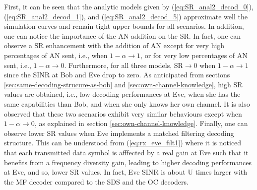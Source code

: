 \documentclass[journal,comsoc]{IEEEtran}
\begin{document}
First, it can be seen that the analytic models given by (\ref{eq:SR_anal2_decod_0}), (\ref{eq:SR_anal2_decod_1}), and (\ref{eq:SR_anal2_decod_5}) approximate well the simulation curves and remain tight upper bounds for all scenarios.  In addition, one can notice the importance of the AN addition on the SR. In fact, one can observe a SR enhancement with the addition of AN except for very high percentages of AN sent, i.e., when $1-\alpha \to 1$, or for very low percentages of AN sent, i.e., $1-\alpha \to 0$. Furthermore, for all three models, SR$\to 0$ when $1-\alpha \to 1$ since the SINR at Bob and Eve drop to zero. As anticipated from sections \ref{sec:same-decoding-strucure-as-bob} and \ref{sec:own-channel-knowledge}, high SR values are obtained, i.e., low decoding performances at Eve, when she has the same capabilities than Bob, and when she only knows her own channel. It is also observed that these two scenarios exhibit very similar behaviours except when $1-\alpha \to 0$, as explained in section \ref{sec:own-channel-knowledge}. Finally, one can observe lower SR values when Eve implements a matched filtering decoding structure. This can be understood from (\ref{eq:rx_eve_filt1}) where it is  noticed that each transmitted data symbol is afffected by a real gain at Eve such that it benefits from a frequency diversity gain, leading to higher decoding performances at Eve, and so, lower SR values. In fact, Eve SINR is about U times larger with the MF decoder compared to the SDS and the OC decoders.
\end{document}
